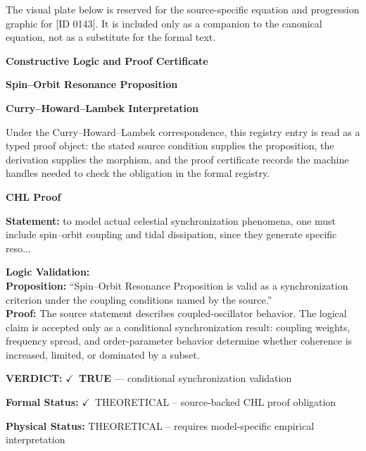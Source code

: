 \begingroup\footnotesize\sloppy
The visual plate below is reserved for the source-specific equation and progression graphic for [ID 0143]. It is included only as a companion to the canonical equation, not as a substitute for the formal text.
\par\endgroup
\ifTZPDarkEdition
{}
\fi

\clearpage
\begingroup\tzpsupportsetup
\noindent\textbf{\fontsize{10.8pt}{12.8pt}\selectfont [ID 0143] Constructive Logic and Proof Certificate}\par
\noindent\textbf{\fontsize{10pt}{12pt}\selectfont Spin--Orbit Resonance Proposition}\par
\vspace{0.45em}
\begingroup
\footnotesize
\setlength{\parskip}{0.22em}
\setlength{\parindent}{0pt}
\noindent\textbf{Curry--Howard--Lambek Interpretation}\par
Under the Curry--Howard--Lambek correspondence, this registry entry is read as a typed proof
object: the stated source condition supplies the proposition, the derivation supplies the
morphism, and the proof certificate records the machine handles needed to check the obligation
in the formal registry.

\vspace{0.45em}
\noindent\textbf{CHL Proof}\par
\textbf{Statement:} to model actual celestial synchronization phenomena, one must include spin--orbit
coupling and tidal dissipation, since they generate specific reso...

\textbf{Logic Validation:}\\
\textbf{Proposition:} ``Spin--Orbit Resonance Proposition is valid as a synchronization criterion under the
coupling conditions named by the source.''\\
\textbf{Proof:} The source statement describes coupled-oscillator behavior. The logical claim is
accepted only as a conditional synchronization result: coupling weights, frequency
spread, and order-parameter behavior determine whether coherence is increased, limited,
or dominated by a subset.

\textbf{VERDICT:} \ensuremath{\checkmark}\ \textbf{TRUE} --- conditional synchronization validation

\textbf{Formal Status:} \ensuremath{\checkmark}\ THEORETICAL -- source-backed CHL proof obligation

\textbf{Physical Status:} THEORETICAL -- requires model-specific empirical interpretation
\par\vspace{0.45em}
\par
\ifTZPDarkEdition
{}
\fi
\endgroup
\endgroup
